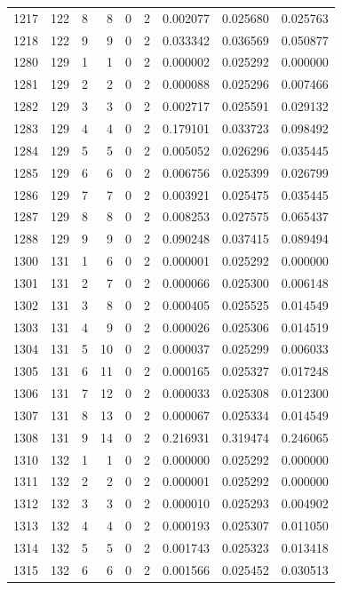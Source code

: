 \begin{longtable}{rrrrrrrrr}
1217 & 122 & 8 & 8 & 0 & 2 & 0.002077 & 0.025680 & 0.025763 \\
1218 & 122 & 9 & 9 & 0 & 2 & 0.033342 & 0.036569 & 0.050877 \\
1280 & 129 & 1 & 1 & 0 & 2 & 0.000002 & 0.025292 & 0.000000 \\
1281 & 129 & 2 & 2 & 0 & 2 & 0.000088 & 0.025296 & 0.007466 \\
1282 & 129 & 3 & 3 & 0 & 2 & 0.002717 & 0.025591 & 0.029132 \\
1283 & 129 & 4 & 4 & 0 & 2 & 0.179101 & 0.033723 & 0.098492 \\
1284 & 129 & 5 & 5 & 0 & 2 & 0.005052 & 0.026296 & 0.035445 \\
1285 & 129 & 6 & 6 & 0 & 2 & 0.006756 & 0.025399 & 0.026799 \\
1286 & 129 & 7 & 7 & 0 & 2 & 0.003921 & 0.025475 & 0.035445 \\
1287 & 129 & 8 & 8 & 0 & 2 & 0.008253 & 0.027575 & 0.065437 \\
1288 & 129 & 9 & 9 & 0 & 2 & 0.090248 & 0.037415 & 0.089494 \\
1300 & 131 & 1 & 6 & 0 & 2 & 0.000001 & 0.025292 & 0.000000 \\
1301 & 131 & 2 & 7 & 0 & 2 & 0.000066 & 0.025300 & 0.006148 \\
1302 & 131 & 3 & 8 & 0 & 2 & 0.000405 & 0.025525 & 0.014549 \\
1303 & 131 & 4 & 9 & 0 & 2 & 0.000026 & 0.025306 & 0.014519 \\
1304 & 131 & 5 & 10 & 0 & 2 & 0.000037 & 0.025299 & 0.006033 \\
1305 & 131 & 6 & 11 & 0 & 2 & 0.000165 & 0.025327 & 0.017248 \\
1306 & 131 & 7 & 12 & 0 & 2 & 0.000033 & 0.025308 & 0.012300 \\
1307 & 131 & 8 & 13 & 0 & 2 & 0.000067 & 0.025334 & 0.014549 \\
1308 & 131 & 9 & 14 & 0 & 2 & 0.216931 & 0.319474 & 0.246065 \\
1310 & 132 & 1 & 1 & 0 & 2 & 0.000000 & 0.025292 & 0.000000 \\
1311 & 132 & 2 & 2 & 0 & 2 & 0.000001 & 0.025292 & 0.000000 \\
1312 & 132 & 3 & 3 & 0 & 2 & 0.000010 & 0.025293 & 0.004902 \\
1313 & 132 & 4 & 4 & 0 & 2 & 0.000193 & 0.025307 & 0.011050 \\
1314 & 132 & 5 & 5 & 0 & 2 & 0.001743 & 0.025323 & 0.013418 \\
1315 & 132 & 6 & 6 & 0 & 2 & 0.001566 & 0.025452 & 0.030513 \\

\end{longtable}
